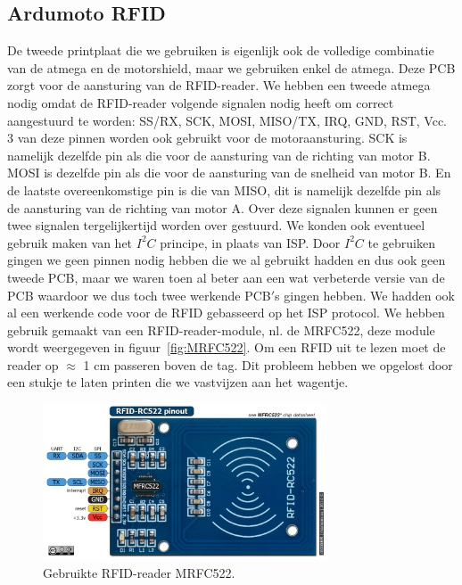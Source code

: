 \subsection{Ardumoto RFID}
De tweede printplaat die we gebruiken is eigenlijk ook de volledige combinatie van de atmega en de motorshield, maar we gebruiken enkel de atmega. Deze PCB zorgt voor de aansturing van de RFID-reader. We hebben een tweede atmega nodig omdat de RFID-reader volgende signalen nodig heeft om correct aangestuurd te worden: SS/RX, SCK, MOSI, MISO/TX, IRQ, GND, RST, Vcc. 3 van deze pinnen worden ook gebruikt voor de motoraansturing. SCK is namelijk dezelfde pin als die voor de aansturing van de richting van motor B. MOSI is dezelfde pin als die voor de aansturing van de snelheid van motor B. En de laatste overeenkomstige pin is die van MISO, dit is namelijk dezelfde pin als de aansturing van de richting van motor A. Over deze signalen kunnen er geen twee signalen tergelijkertijd worden over gestuurd. We konden ook eventueel gebruik maken van het $I^{2}C$ principe, in plaats van ISP. Door $I^{2}C$ te gebruiken gingen we geen pinnen nodig hebben die we al gebruikt hadden en dus ook geen tweede PCB, maar we waren toen al beter aan een wat verbeterde versie van de PCB waardoor we dus toch twee werkende PCB$\prime$s gingen hebben. We hadden ook al een werkende code voor de RFID gebasseerd op het ISP protocol. We hebben gebruik gemaakt van een RFID-reader-module, nl. de MRFC522, deze module wordt weergegeven in figuur~\ref{fig:MRFC522}. Om een RFID uit te lezen moet de reader op $\approx$ 1 cm passeren boven de tag. Dit probleem hebben we opgelost door een stukje te laten printen die we vastvijzen aan het wagentje.
\begin{figure}[h]
\centering
\includegraphics[width=0.75\textwidth]{MRFC522.png}
\caption{Gebruikte RFID-reader MRFC522. \label{fig:MRFC522}}
\label{fig:ACEquiv}
\end{figure}
